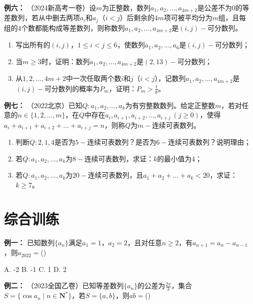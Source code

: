 \documentclass{article}
\begin{document}
\noindent \textbf{例六： }（2024新高考一卷）设$m$为正整数，数列$a_1, a_2, \dots, a_{4m+2}$是公差不为$0$的等差数列，若从中删去两项$a_i$和$a_j$（$i<j$）后剩余的$4m$项可被平均分为$m$组，且每组的$4$个数都能构成等差数列，则称数列$a_1, a_2, \dots, a_{4m+2}$是$(i,j)-$可分数列。

\begin{enumerate}[label=(\Roman*)]
    \item 写出所有的$(i,j)$，$1 \le i < j \le 6$，使数列$a_1, a_2, \dots, a_6$是$(i,j)-$可分数列；
    \item 当$m \ge 3$时，证明：数列$a_1, a_2, \dots, a_{4m+2}$是$(2,13)-$可分数列；
    \item 从$1,2,\dots,4m+2$中一次任取两个数$i$和$j$（$i<j$），记数列$a_1, a_2, \dots, a_{4m+2}$是$(i,j)-$可分数列的概率为$P_m$，证明：$P_m > \frac{1}{8}$。
\end{enumerate}
\newpage

 \noindent \textbf{例七： }（2022北京）已知$Q: a_1, a_2, \dots, a_k$为有穷整数数列。给定正整数$m$，若对任意的$n \in \{1,2,\dots,m\}$，在$Q$中存在$a_i, a_{i+1}, a_{i+2}, \dots, a_{i+j} \ (j \ge 0)$，使得$a_i + a_{i+1} + a_{i+2} + \dots + a_{i+j} = n$，则称$Q$为$m-$连续可表数列。

\begin{enumerate}[label=(\Roman*)]
    \item 判断$Q: 2, 1, 4$是否为$5-$连续可表数列？是否为$6-$连续可表数列？说明理由；
    \item 若$Q: a_1, a_2, \dots, a_k$为$8-$连续可表数列，求证：$k$的最小值为$4$；
    \item 若$Q: a_1, a_2, \dots, a_k$为$20-$连续可表数列，且$a_1 + a_2 + \dots + a_k < 20$，求证：$k \ge 7$。
\end{enumerate}
\newpage

\section{综合训练}

 \noindent \textbf{例一： } 已知数列$\{a_n\}$满足$a_1 = 1$，$a_2 = 2$，且对任意$n \ge 2$，有$a_{n+1} = a_n - a_{n-1}$，则$a_{2022}=$(\;\;\;)

\vspace{1em}
A. -2 \quad
B. -1 \quad
C. 1 \quad
D. 2
\vspace{2\baselineskip}


 \noindent \textbf{例二： }（2023全国乙卷）已知等差数列$\{a_n\}$的公差为$\frac{2\pi}{3}$，集合$S = \{\cos a_n \mid n \in \mathbf{N}^*\}$，若$S = \{a,b\}$，则$ab =$(\;\;\;)
\end{document}
